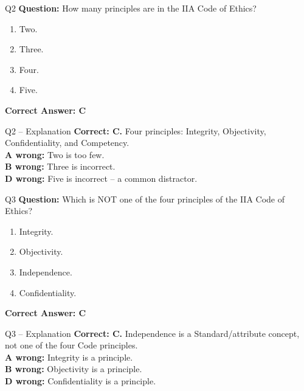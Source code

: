 \documentclass[aspectratio=169,10pt]{beamer}
\begin{document}
	\begin{frame}[t]{Q2}
		\small
		\textbf{Question:} How many principles are in the IIA Code of Ethics?
		\begin{enumerate}[label=\Alph*.,itemsep=1pt,topsep=2pt]
			\item Two.
			\item Three.
			\item Four.
			\item Five.
		\end{enumerate}
		\vspace{4pt}
		\textbf{Correct Answer: C}
	\end{frame}
	
	\begin{frame}[t]{Q2 -- Explanation}
		\small
		\textbf{Correct: C.} Four principles: Integrity, Objectivity, Confidentiality, and Competency. \\[4pt]
		\textbf{A wrong:} Two is too few. \\[2pt]
		\textbf{B wrong:} Three is incorrect. \\[2pt]
		\textbf{D wrong:} Five is incorrect -- a common distractor.
	\end{frame}
	
	\begin{frame}[t]{Q3}
		\small
		\textbf{Question:} Which is NOT one of the four principles of the IIA Code of Ethics?
		\begin{enumerate}[label=\Alph*.,itemsep=1pt,topsep=2pt]
			\item Integrity.
			\item Objectivity.
			\item Independence.
			\item Confidentiality.
		\end{enumerate}
		\vspace{4pt}
		\textbf{Correct Answer: C}
	\end{frame}
	
	\begin{frame}[t]{Q3 -- Explanation}
		\small
		\textbf{Correct: C.} Independence is a Standard/attribute concept, not one of the four Code principles. \\[4pt]
		\textbf{A wrong:} Integrity is a principle. \\[2pt]
		\textbf{B wrong:} Objectivity is a principle. \\[2pt]
		\textbf{D wrong:} Confidentiality is a principle.
	\end{frame}
	
\end{document}
